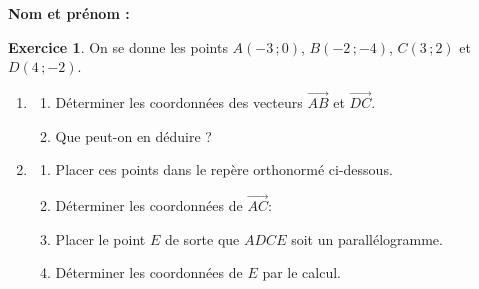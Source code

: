 \documentclass{article}
\theoremstyle{definition}
\newtheorem{exercice}{Exercice}
\begin{document}
\pagestyle{fancy}

\fancyhf{} %
\fancyhead[L]{\large \textbf{\Niveau}}
\fancyhead[C]{\large \textbf{\ChapitreCourt}}

\large

\textbf{Nom et prénom :}\enspace\dotfill

\begin{exercice}
  On se donne les points $A(-3\,; 0)$, $B(-2\,; -4)$, $C(3\,; 2)$ et $D(4\,; -2)$.

  \begin{enumerate}
    \item
      \begin{enumerate}
        \item Déterminer les coordonnées des vecteurs $\overrightarrow{AB}$ et $\overrightarrow{DC}$.
        \item Que peut-on en déduire ?
      \end{enumerate}
    \begin{center}
    \end{center}
    \item
      \begin{enumerate}
        \item Placer ces points dans le repère orthonormé ci-dessous.
        \item Déterminer les coordonnées de $\overrightarrow{AC}$:
        \begin{center}
          \end{center}
        \item Placer le point $E$ de sorte que $ADCE$ soit un parallélogramme.
        \item Déterminer les coordonnées de $E$ par le calcul.
        \begin{center}
        \end{center}
      \end{enumerate}
  \end{enumerate}
  \begin{center}

\end{center}
\end{exercice}
\end{document}
